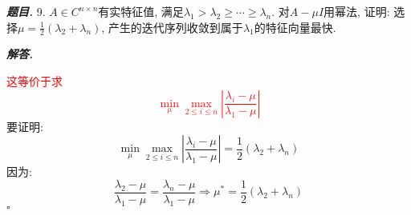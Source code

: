 \documentclass[10pt, a4paper, oneside]{ctexart}
\newenvironment{problem}{\begin{framed}\par\noindent\textbf{\textit{题目. }}}{\end{framed}\par}
\newenvironment{solution}{%
  \par\noindent\textbf{\textit{解答. }}\ignorespaces
}{%
  \hfill\ensuremath{\square}\par %
}
\begin{document}
    \begin{problem}
        9. $A\in C^{n\times n}$有实特征值, 满足$\lambda_1>\lambda_2\geq \cdots \geq \lambda_n$. 对$A-\mu I$用幂法, 证明: 选择$\mu=\frac{1}{2}(\lambda_2+\lambda_n)$, 产生的迭代序列收敛到属于$\lambda_1$的特征向量最快.
    \end{problem}
    \begin{solution}
    \textcolor{red}{这等价于求
    $$\min_{\mu} \max_{2\leq i\leq n} |\frac{\lambda_i-\mu}{\lambda_1-\mu}|$$}
    要证明:
    $$\min_{\mu} \max_{2\leq i\leq n} |\frac{\lambda_i-\mu}{\lambda_1-\mu}|=\frac{1}{2}(\lambda_2+\lambda_n)$$
    因为:
    $$\frac{\lambda_2-\mu}{\lambda_1-\mu}=\frac{\lambda_n-\mu}{\lambda_1-\mu}\Rightarrow \mu^*=\frac{1}{2}(\lambda_2+\lambda_n)$$
    \end{solution}
    
\end{document}
